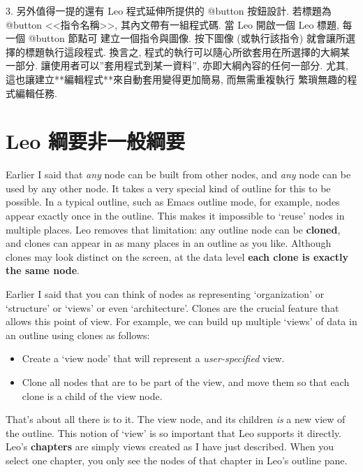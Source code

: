 \documentclass[a4paper,10pt,english]{sphinxmanual}
\begin{document}
3. 另外值得一提的還有 Leo 程式延伸所提供的 @button 按鈕設計. 若標題為 @button
\textless{}\textless{}指令名稱\textgreater{}\textgreater{}, 其內文帶有一組程式碼. 當 Leo 開啟一個 Leo 標題, 每一個 @button 節點可
建立一個指令與圖像. 按下圖像 (或執行該指令) 就會讓所選擇的標題執行這段程式.
換言之, 程式的執行可以隨心所欲套用在所選擇的大綱某一部分. 讓使用者可以''套用程式到某一資料'',
亦即大綱內容的任何一部分. 尤其, 這也讓建立**編輯程式**來自動套用變得更加簡易, 而無需重複執行
繁瑣無趣的程式編輯任務.


\section{Leo 綱要非一般綱要}
\label{preface:leo}
Earlier I said that \emph{any} node can be built from other nodes, and \emph{any} node can
be used by any other node. It takes a very special kind of outline for this to
be possible. In a typical outline, such as Emacs outline mode, for example,
nodes appear exactly once in the outline. This makes it impossible to `reuse'
nodes in multiple places. Leo removes that limitation: any outline node can be
\textbf{cloned}, and clones can appear in as many places in an outline as you like.
Although clones may look distinct on the screen, at the data level
\textbf{each clone is exactly the same node}.

Earlier I said that you can think of nodes as representing `organization' or
`structure' or `views' or even `architecture'. Clones are the crucial feature
that allows this point of view. For example, we can build up multiple `views' of
data in an outline using clones as follows:
\begin{itemize}
\item {} 
Create a `view node' that will represent a \emph{user-specified} view.

\item {} 
Clone all nodes that are to be part of the view, and move them so that each
clone is a child of the view node.

\end{itemize}

That's about all there is to it. The view node, and its children \emph{is} a new view
of the outline. This notion of `view' is so important that Leo supports it
directly. Leo's \textbf{chapters} are simply views created as I have just described.
When you select one chapter, you only see the nodes of that chapter in Leo's
outline pane.
\end{document}
